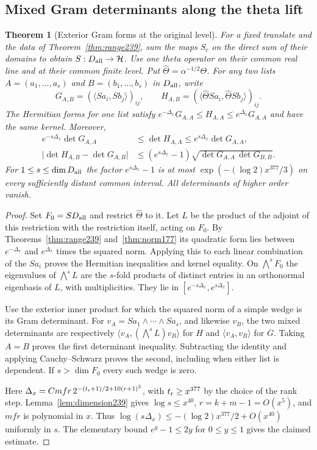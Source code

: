 \documentclass[a4paper,11pt]{article}
\newtheorem{theorem}[proposition]{Theorem}
\theoremstyle{definition}
\theoremstyle{remark}
\numberwithin{equation}{section}
\begin{document}
\subsection{Mixed Gram determinants along the theta lift}\label{nav:VIII-33}
\begin{theorem}[Exterior Gram forms at the original level]
\label{thm:minors239}
For a fixed translate and the data of Theorem~\ref{thm:range239},
sum the maps \(S_c\) on the direct sum of their domains to
obtain \(S:D_{\rm all}\to\mathcal H\).
Use one theta operator on their common real line and at their
common finite level. Put \(\widehat\Theta=\alpha^{-1/2}\Theta\).
For any two lists \(A=(a_1,\ldots,a_s)\) and \(B=(b_1,\ldots,b_s)\)
in \(D_{\rm all}\), write
\[
 G_{A,B}=(\langle Sa_i,Sb_j\rangle)_{ij},\qquad
 H_{A,B}=(\langle\widehat\Theta Sa_i,\widehat\Theta Sb_j\rangle)_{ij}.
\]
The Hermitian forms for one list satisfy
\(e^{-\Delta_x}G_{A,A}\le H_{A,A}\le e^{\Delta_x}G_{A,A}\)
and have the same kernel. Moreover,
\[
 \begin{split}
 e^{-s\Delta_x}\det G_{A,A}
   &\le\det H_{A,A}\le e^{s\Delta_x}\det G_{A,A},\\
 \big|\det H_{A,B}-\det G_{A,B}\big|
   &\le (e^{s\Delta_x}-1)
              \sqrt{\det G_{A,A}\,\det G_{B,B}} .
 \end{split}
\]
For \(1\le s\le\dim D_{\rm all}\) the factor \(e^{s\Delta_x}-1\)
is at most \(\exp(-(\log 2)x^{377}/3)\) on every sufficiently
distant common interval. All determinants of higher order vanish.
\end{theorem}
\begin{proof}
Set \(F_0=S D_{\rm all}\) and restrict \(\widehat\Theta\) to it.
Let \(L\) be the product of the adjoint of this restriction
with the restriction itself, acting on \(F_0\). By
Theorems~\ref{thm:range239} and~\ref{thm:norm177} its quadratic
form lies between \(e^{-\Delta_x}\) and \(e^{\Delta_x}\) times
the squared norm. Applying this to each linear combination of
the \(Sa_i\) proves the Hermitian inequalities and kernel equality.
On \(\bigwedge^s F_0\) the eigenvalues of \(\bigwedge^s L\)
are the \(s\)-fold products of distinct entries in an
orthonormal eigenbasis of \(L\), with multiplicities.
They lie in \([e^{-s\Delta_x},e^{s\Delta_x}]\).

Use the exterior inner product for which the squared norm of a
simple wedge is its Gram determinant. For
\(v_A=Sa_1\wedge\cdots\wedge Sa_s\), and likewise \(v_B\),
the two mixed determinants are respectively
\(\langle v_A,(\bigwedge^s L)v_B\rangle\) for \(H\) and
\(\langle v_A,v_B\rangle\) for \(G\). Taking \(A=B\) proves
the first determinant inequality. Subtracting the identity
and applying Cauchy--Schwarz proves the second, including
when either list is dependent. If \(s>\dim F_0\) every such
wedge is zero.

Here \(\Delta_x=Cmfr\,2^{-(t_{\rm r}+1)/2+10(r+1)^3}\), with
\(t_{\rm r}\ge x^{377}\) by the choice of the rank step.
Lemma~\ref{lem:dimension239} gives \(\log s\le x^{40}\),
\(r=k+m-1=O(x^5)\), and \(mfr\) is polynomial in \(x\).
Thus \(\log(s\Delta_x)\le-(\log 2)x^{377}/2+O(x^{40})\)
uniformly in \(s\). The elementary bound \(e^y-1\le2y\)
for \(0\le y\le1\) gives the claimed estimate.
\end{proof}
\end{document}
